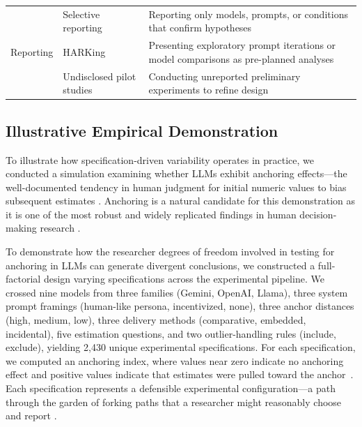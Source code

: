 \documentclass{article}
\theoremstyle{plain}
\theoremstyle{definition}
\theoremstyle{remark}
\begin{document}
\begin{table}[htp]
\begin{tabularx}{\textwidth}{@{}p{3cm}p{3.2cm}X@{}}
\multirow{3}{*}{\parbox{2.4cm}{Reporting}} 
 & Selective reporting & Reporting only models, prompts, or conditions that confirm hypotheses \\[0.5em]
 & HARKing & Presenting exploratory prompt iterations or model comparisons as pre-planned analyses \\[0.5em]
 & Undisclosed pilot studies & Conducting unreported preliminary experiments to refine design \\

\bottomrule
\end{tabularx}
\end{table}

\subsection{Illustrative Empirical Demonstration}
To illustrate how specification-driven variability operates in practice, we conducted a simulation examining whether LLMs exhibit anchoring effects---the well-documented tendency in human judgment for initial numeric values to bias subsequent estimates \citep{tversky1974judgment,jacowitz1995measures}. Anchoring is a natural candidate for this demonstration as it is one of the most robust and widely replicated findings in human decision-making research \citep{furnham2011literature,roseler2022metaanalysis}. 

To demonstrate how the researcher degrees of freedom involved in testing for anchoring in LLMs can generate divergent conclusions, we constructed a full-factorial design varying specifications across the experimental pipeline. We crossed nine models from three families (Gemini, OpenAI, Llama), three system prompt framings (human-like persona, incentivized, none), three anchor distances (high, medium, low), three delivery methods (comparative, embedded, incidental), five estimation questions, and two outlier-handling rules (include, exclude), yielding 2,430 unique experimental specifications. For each specification, we computed an anchoring index, where values near zero indicate no anchoring effect and positive values indicate that estimates were pulled toward the anchor~\citep{jacowitz1995measures}. Each specification represents a defensible experimental configuration---a path through the garden of forking paths that a researcher might reasonably choose and report \citep{gelman2013forkingpaths}.
\end{document}
